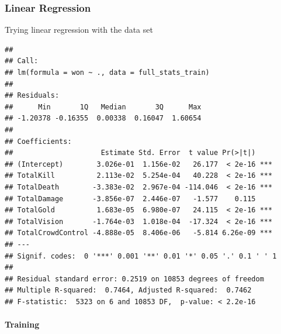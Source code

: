 \documentclass[
]{article}
\newenvironment{Shaded}{\begin{snugshade}}{\end{snugshade}}
\newcommand{\AttributeTok}[1]{\textcolor[rgb]{0.77,0.63,0.00}{#1}}
\newcommand{\DecValTok}[1]{\textcolor[rgb]{0.00,0.00,0.81}{#1}}
\newcommand{\FunctionTok}[1]{\textcolor[rgb]{0.00,0.00,0.00}{#1}}
\newcommand{\NormalTok}[1]{#1}
\newcommand{\OtherTok}[1]{\textcolor[rgb]{0.56,0.35,0.01}{#1}}
\newcommand{\SpecialCharTok}[1]{\textcolor[rgb]{0.00,0.00,0.00}{#1}}
\begin{document}
\hypertarget{linear-regression}{%
\subsubsection{Linear Regression}\label{linear-regression}}

Trying linear regression with the data set

\begin{Shaded}
\end{Shaded}

\begin{verbatim}
## 
## Call:
## lm(formula = won ~ ., data = full_stats_train)
## 
## Residuals:
##      Min       1Q   Median       3Q      Max 
## -1.20378 -0.16355  0.00338  0.16047  1.60654 
## 
## Coefficients:
##                     Estimate Std. Error  t value Pr(>|t|)    
## (Intercept)        3.026e-01  1.156e-02   26.177  < 2e-16 ***
## TotalKill          2.113e-02  5.254e-04   40.228  < 2e-16 ***
## TotalDeath        -3.383e-02  2.967e-04 -114.046  < 2e-16 ***
## TotalDamage       -3.856e-07  2.446e-07   -1.577    0.115    
## TotalGold          1.683e-05  6.980e-07   24.115  < 2e-16 ***
## TotalVision       -1.764e-03  1.018e-04  -17.324  < 2e-16 ***
## TotalCrowdControl -4.888e-05  8.406e-06   -5.814 6.26e-09 ***
## ---
## Signif. codes:  0 '***' 0.001 '**' 0.01 '*' 0.05 '.' 0.1 ' ' 1
## 
## Residual standard error: 0.2519 on 10853 degrees of freedom
## Multiple R-squared:  0.7464, Adjusted R-squared:  0.7462 
## F-statistic:  5323 on 6 and 10853 DF,  p-value: < 2.2e-16
\end{verbatim}

\hypertarget{training}{%
\paragraph{Training}\label{training}}
\end{document}
